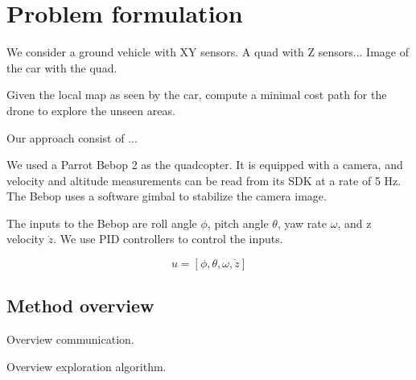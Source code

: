 
\section{Problem formulation}

We consider a ground vehicle with XY sensors. 
A quad with Z sensors...
Image of the car with the quad.

\begin{problem}
Given the local map as seen by the car, compute a minimal cost path for the drone to explore the unseen areas.
\end{problem}

Our approach consist of ...

We used a Parrot Bebop 2 as the quadcopter. It is equipped with a camera,
and velocity and altitude measurements can be read from its SDK at a rate of
5 Hz. The Bebop uses a software gimbal to stabilize the camera image.

The inputs to the Bebop are roll angle $\phi$, pitch angle $\theta$, 
yaw rate $\omega$, and z velocity $\dot{z}$. We use
PID controllers to control the inputs.

$$ u = [\phi, \theta, \omega, \dot{z}] $$

\subsection{Method overview}
Overview communication.

Overview exploration algorithm.